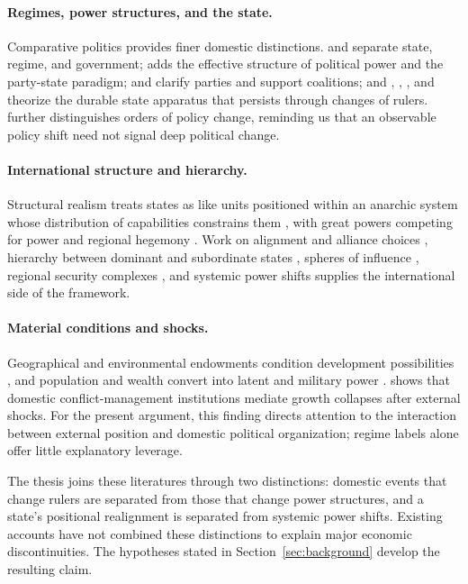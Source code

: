 \documentclass[11pt]{article}
\begin{document}
\paragraph{Regimes, power structures, and the state.} Comparative politics provides finer domestic distinctions. \textcite{linz_stepan_1996} and \textcite{linz_2000} separate state, regime, and government; \textcite{garciatrevijano2010} adds the effective structure of political power and the party-state paradigm; \textcite{sartori_1976} and \textcite{bueno_de_mesquita_2003} clarify parties and support coalitions; and \textcite{weber1922wirtschaft}, \textcite{althusser_1971}, \textcite{tilly_1990}, and \textcite{skocpol_1979} theorize the durable state apparatus that persists through changes of rulers. \textcite{hall_1993} further distinguishes orders of policy change, reminding us that an observable policy shift need not signal deep political change.

\paragraph{International structure and hierarchy.} Structural realism treats states as like units positioned within an anarchic system whose distribution of capabilities constrains them \parencite{waltz_1979}, with great powers competing for power and regional hegemony \parencite{mearsheimer_2001}. Work on alignment and alliance choices \parencite{walt_1987}, hierarchy between dominant and subordinate states \parencite{lake_2009}, spheres of influence \parencite{keal_1983,hast_2014}, regional security complexes \parencite{buzan_waever_2003}, and systemic power shifts \parencite{gilpin_1981} supplies the international side of the framework.

\paragraph{Material conditions and shocks.} Geographical and environmental endowments condition development possibilities \parencite{diamond_1997}, and population and wealth convert into latent and military power \parencite{mearsheimer_2001}. \textcite{rodrik_1999} shows that domestic conflict-management institutions mediate growth collapses after external shocks. For the present argument, this finding directs attention to the interaction between external position and domestic political organization; regime labels alone offer little explanatory leverage.

The thesis joins these literatures through two distinctions: domestic events that change rulers are separated from those that change power structures, and a state's positional realignment is separated from systemic power shifts. Existing accounts have not combined these distinctions to explain major economic discontinuities. The hypotheses stated in Section~\ref{sec:background} develop the resulting claim.
\end{document}
